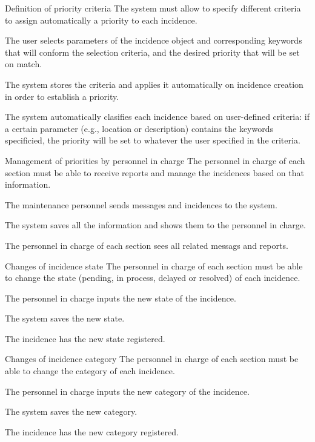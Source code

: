 \begin{requirement}{Definition of priority criteria}
\reqdesc The system must allow to specify different criteria to assign automatically a priority to each incidence.

\reqin The user selects parameters of the incidence object and corresponding keywords that will conform the selection criteria, and the desired priority that will be set on match.

\reqsteps The system stores the criteria and applies it automatically on incidence creation in order to establish a priority.

\reqout The system automatically clasifies each incidence based on user-defined criteria: if a certain parameter (e.g., location or description) contains the keywords specificied, the priority will be set to whatever the user specified in the criteria.
\end{requirement}


\begin{requirement}{Management of priorities by personnel in charge}
\reqdesc The personnel in charge of each section must be able to receive reports and manage the incidences based on that information.

\reqin The maintenance personnel sends messages and incidences to the system.

\reqsteps The system saves all the information and shows them to the personnel in charge.

\reqout The personnel in charge of each section sees all related messags and reports.
\end{requirement}


\begin{requirement}{Changes of incidence state}
\reqdesc The personnel in charge of each section must be able to change the state (pending, in process, delayed or resolved) of each incidence.

\reqin The personnel in charge inputs the new state of the incidence.

\reqsteps The system saves the new state.

\reqout The incidence has the new state registered.
\end{requirement}

\begin{requirement}{Changes of incidence category}
\reqdesc The personnel in charge of each section must be able to change the category of each incidence.

\reqin The personnel in charge inputs the new category of the incidence.

\reqsteps The system saves the new category.

\reqout The incidence has the new category registered.
\end{requirement}


